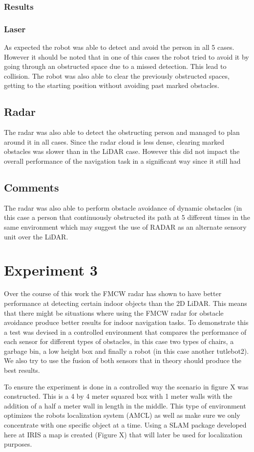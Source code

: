 \subsubsection{Results}
\subsubsection{Laser}
As expected the robot was able to detect and avoid the person in all 5 cases. However it should be noted that in one of this cases the robot tried to avoid it by going through an obstructed space due to a missed detection. This lead to collision. The robot was also able to clear the previously obstructed spaces, getting to the starting position without avoiding past marked obstacles.
\subsection{Radar}
The radar was also able to detect the obstructing person and managed to plan around it in all cases. Since the radar cloud is less dense, clearing marked obstacles was slower than in the \ac{LiDAR} case. However this did not impact the overall performance of the navigation task in a significant way since it still had 
\subsection{Comments}
 The radar was also able to perform 
obstacle avoidance of dynamic obstacles (in this case a person that continuously obstructed its path at 5 different times in the same environment which may suggest the use of \ac{RADAR} as an alternate sensory unit over the \ac{LiDAR}.
\section {Experiment 3}
Over the course of this work the \ac{FMCW} radar has shown to have better performance at detecting certain indoor objects than the 2D \ac{LiDAR}. This means that there might be situations where using the \ac{FMCW} radar for obstacle avoidance produce better results for indoor navigation tasks. To demonstrate this a test was devised in a controlled environment that compares the performance of each sensor for different types of obstacles, in this case two types of chairs, a garbage bin, a low height box and finally a robot (in this case another tutlebot2).  We also try to use the fusion of both sensors that in theory should produce the best results.


To ensure the experiment is done in a controlled way the scenario in figure X was constructed. This is a 4 by 4 meter squared box with 1 meter walls with the addition of a half a meter wall in length in the middle. This type of environment optimizes the robots localization system (\ac{AMCL}) as well as make sure we only concentrate with one specific object at a time. Using a \ac{SLAM} package developed here at \ac{IRIS} a map is created (Figure X) that will later be used for localization purposes.
